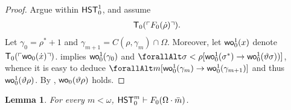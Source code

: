 \documentclass[UKenglish,cleveref,DIV=12]{scrartcl}
\let\forall\forallAlt
\newtheorem{lemma}{Lemma}
\theoremstyle{definition}
\theoremstyle{definition}
\begin{document}
\begin{proof}
Argue within $\mathsf{HST}_0^1$, and assume
\begin{align}\label{eqn:F0tech1}
  \mathsf{T}_0(\ulcorner{F_0(\dot\rho)}\urcorner).
\end{align}
Let $\gamma_0=\rho^*+1$ and $\gamma_{m+1}=C(\rho,\gamma_m)\cap\Omega$.
Moreover, let $\mathsf{wo}_0^1(x)$ denote $\mathsf{T}_0(\ulcorner{\mathsf{wo}_0(\dot x)}\urcorner)$.
 implies $\mathsf{wo}_0^1(\gamma_0)$ and
$\forall\sigma<\rho[\wo_0^1(\sigma^*)\rightarrow\wo_0^1(\vartheta\sigma))]$, whence
it is easy to deduce $\forall m[\wo_0^1(\gamma_m)\rightarrow\wo_0^1(\gamma_{m+1})]$
and thus $\mathsf{wo}_0^1(\vartheta\rho)$. By , $\mathsf{wo}_0(\vartheta\rho)$ holds.
\end{proof}
\begin{lemma}\label{extprop:F0wellordering}
  For every $m<\omega$, $\mathsf{HST}_0^m\vdash F_0(\Omega\cdot\bar{m})$.
\end{lemma}
\end{document}
